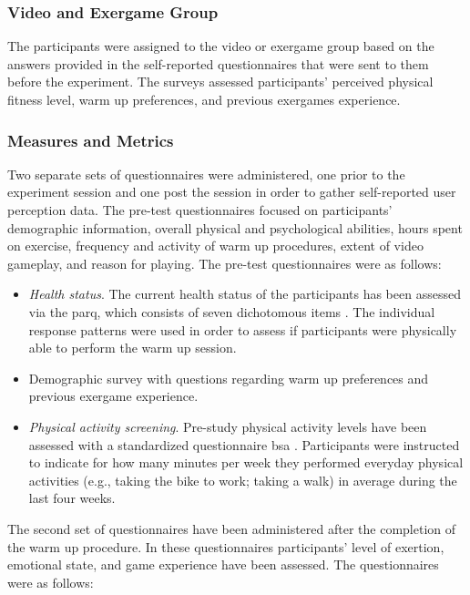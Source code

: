 \subsubsection{Video and Exergame Group}
The participants were assigned to the video or exergame group based on the answers provided in the self-reported questionnaires that were sent to them before the experiment. The surveys assessed participants' perceived physical fitness level, warm up preferences, and previous exergames experience.
\subsubsection{Measures and Metrics}
Two separate sets of questionnaires were administered, one
prior to the experiment session and one post the session in order to gather self-reported user perception data.
The pre-test questionnaires focused on participants' demographic information, overall physical and psychological abilities, hours spent on exercise, frequency and activity
of warm up procedures, extent of video gameplay, and reason for playing. The pre-test questionnaires were as follows:
\begin{itemize}
\item \textit{Health status}. The current health status of the participants has been assessed via the \gls{parq}, which consists of seven dichotomous items \cite{thomas1992revision}. The individual response patterns were used in order to assess if participants were physically able to perform the warm up session. 
\item Demographic survey with questions regarding warm up preferences and previous exergame experience.
\item \textit{Physical activity screening}. Pre-study physical activity levels have been assessed with a standardized questionnaire  \gls{bsa} \cite{fuchs2015messung}. Participants were instructed to indicate for how many minutes per week they performed everyday physical activities (e.g., taking the bike to work; taking a walk) in average during the last four weeks. 
\end{itemize}
The second set of questionnaires have been administered after the completion of the warm up procedure. In these questionnaires participants' level of exertion, emotional state, and game experience have been assessed. The questionnaires were as follows:
